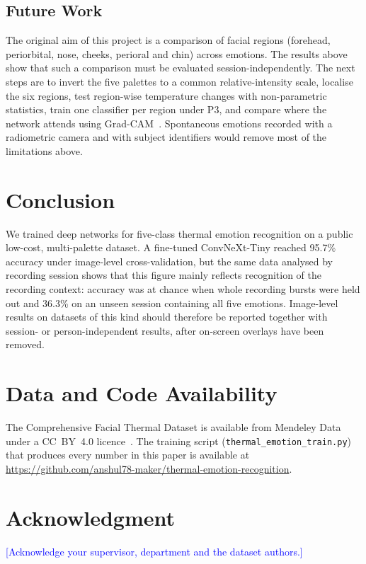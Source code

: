 \documentclass[10pt,twocolumn,letterpaper]{article}
\newcommand{\pholder}[1]{\textcolor{blue}{[#1]}}
\begin{document}
\subsection{Future Work}
The original aim of this project is a comparison of facial regions (forehead, periorbital, nose, cheeks, perioral and chin) across emotions. The results above show that such a comparison must be evaluated session-independently. The next steps are to invert the five palettes to a common relative-intensity scale, localise the six regions, test region-wise temperature changes with non-parametric statistics, train one classifier per region under P3, and compare where the network attends using Grad-CAM~\cite{gradcam}. Spontaneous emotions recorded with a radiometric camera and with subject identifiers would remove most of the limitations above.

\section{Conclusion}
We trained deep networks for five-class thermal emotion recognition on a public low-cost, multi-palette dataset. A fine-tuned ConvNeXt-Tiny reached 95.7\% accuracy under image-level cross-validation, but the same data analysed by recording session shows that this figure mainly reflects recognition of the recording context: accuracy was at chance when whole recording bursts were held out and 36.3\% on an unseen session containing all five emotions. Image-level results on datasets of this kind should therefore be reported together with session- or person-independent results, after on-screen overlays have been removed.

\section*{Data and Code Availability}
The Comprehensive Facial Thermal Dataset is available from Mendeley Data under a CC~BY~4.0 licence~\cite{dataset}. The training script (\texttt{thermal\_emotion\_train.py}) that produces every number in this paper is available at \url{https://github.com/anshul78-maker/thermal-emotion-recognition}.

\section*{Acknowledgment}
\pholder{Acknowledge your supervisor, department and the dataset authors.}
\end{document}
